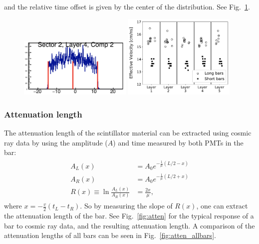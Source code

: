 \documentclass[review]{elsarticle}
\begin{document}
and the relative time offset is given by the center of the distribution. See Fig.~\ref{fig:eff_vel}.

\begin{figure}[h!]
	\centering
		\includegraphics[width=0.48\textwidth]{lr_eff_vel.png}
		\includegraphics[width=0.48\textwidth]{eff_vel.pdf}
	\caption{}
	\label{fig:eff_vel}
\end{figure}

\subsubsection{Attenuation length}
The attenuation length of the scintillator material can be extracted using cosmic ray data by using the 
amplitude ($A$) and time measured by both PMTs in the bar:
\begin{eqnarray}
	\begin{split}
		A_L(x) &= A_0 e^{-\frac{1}{\mu}\left(L/2-x\right) }				\\
		A_R(x) &= A_0 e^{-\frac{1}{\mu}\left(L/2+x\right) }				\\
		R(x) \equiv \ln{\frac{A_L(x)}{A_R(x)}} &= \frac{2x}{\mu},					
		 \label{eqn:atten}
	\end{split}
\end{eqnarray}
where $x=-\frac{v}{2}(t_L - t_R)$. So by measuring the slope of $R(x)$, one can extract the attenuation length 
of the bar. See Fig.~\ref{fig:atten} for the typical response of a bar to cosmic ray data, and the resulting attenuation 
length. {\color{red}A comparison of the attenuation lengths of all bars can be seen in Fig.~\ref{fig:atten_allbars}}.
\end{document}
